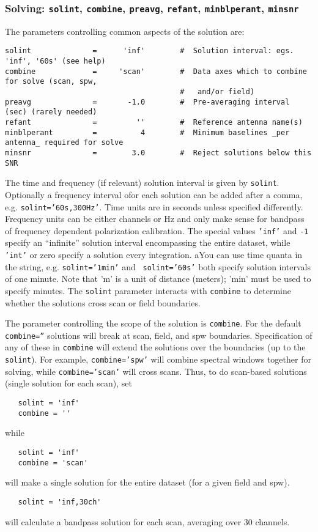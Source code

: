 \subsubsection{Solving: {\tt solint}, {\tt combine},
{\tt preavg}, {\tt refant}, {\tt minblperant}, {\tt minsnr} }
\label{section:cal.solve.pars.solving}

The parameters controlling common aspects of the solution are:
\small
\begin{verbatim}
solint              =      'inf'        #  Solution interval: egs. 'inf', '60s' (see help)
combine             =     'scan'        #  Data axes which to combine for solve (scan, spw,
                                        #   and/or field)
preavg              =       -1.0        #  Pre-averaging interval (sec) (rarely needed)
refant              =         ''        #  Reference antenna name(s)
minblperant         =          4        #  Minimum baselines _per antenna_ required for solve
minsnr              =        3.0        #  Reject solutions below this SNR
\end{verbatim} 
\normalsize

The time and frequency (if relevant) solution interval is given by {\tt solint}. Optionally a
frequency interval ofor each solution can be added after a comma,
e.g. {\tt solint='60s,300Hz'}. Time units are in seconds unless
specified differently. Frequency units can be either channels or Hz
and only make sense for bandpass of frequency dependent polarization
calibration.  The special values {\tt 'inf'} and {\tt -1} specify an
``infinite'' solution interval encompassing the entire dataset, while
{\tt 'int'} or zero specify a solution every integration.  aYou can
use time quanta in the string, e.g. {\tt solint='1min'} and {\tt
  solint='60s'} both specify solution intervals of one minute.  Note
that 'm' is a unit of distance (meters); 'min' must be used to specify
minutes.  The {\tt solint} parameter interacts with {\tt combine} to
determine whether the solutions cross scan or field boundaries.

The parameter controlling the scope of the solution is {\tt combine}.
For the default {\tt combine=''} solutions will break at scan, field, and spw
boundaries.  Specification of any of these in {\tt combine} will
extend the solutions over the boundaries (up to the {\tt solint}). 
For example, {\tt combine='spw'} will combine spectral windows
together for solving, while {\tt combine='scan'} will cross scans.  
Thus, to do scan-based solutions (single solution for each scan), set
\small
\begin{verbatim}
   solint = 'inf'
   combine = ''
\end{verbatim} 
\normalsize
while
\small
\begin{verbatim}
   solint = 'inf'
   combine = 'scan'
\end{verbatim} 
\normalsize
will make a single solution for the entire dataset (for a given field
and spw).  
\small
\begin{verbatim}
   solint = 'inf,30ch'
\end{verbatim}
will calculate a bandpass solution for each scan, averaging over 30
channels.

